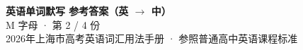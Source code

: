 \documentclass[10pt,a4paper]{article}
\begin{document}
\pagestyle{plain}

\begin{center}
{\LARGE\bfseries 英语单词默写 \quad 参考答案（英 $\to$ 中）}\\[0.22em]
{\large M 字母 · 第 2 / 4 份}\\[0.18em]
{\small 2026年上海市高考英语词汇用法手册 · 参照普通高中英语课程标准}
\end{center}

\vspace{0.2em}
\noindent{\color{rulegray}\rule{\textwidth}{0.8pt}}

\vspace{0.35em}

\vspace{0.25em}
\renewcommand{\arraystretch}{1.32}
\end{document}
